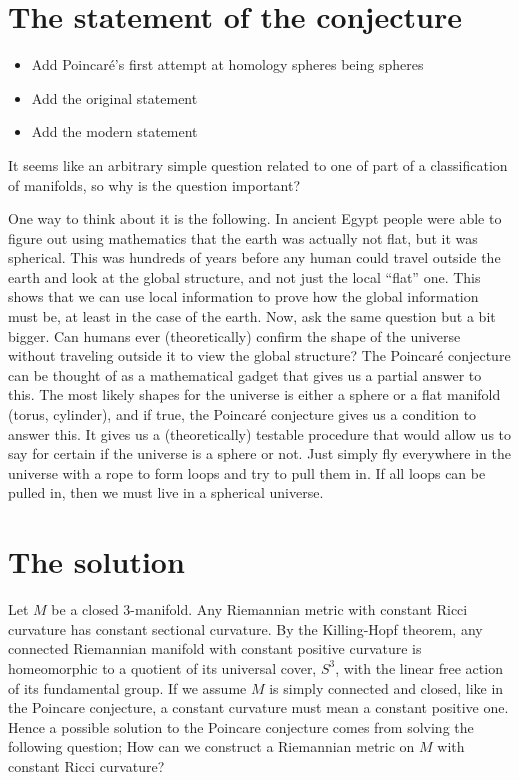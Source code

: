 

\section{The statement of the conjecture}

\begin{itemize}
    \item Add Poincaré's first attempt at homology spheres being spheres
    \item Add the original statement
    \item Add the modern statement
\end{itemize}

It seems like an arbitrary simple question related to one of part of a classification of manifolds, so why is the question important? 

One way to think about it is the following. 
In ancient Egypt people were able to figure out using mathematics that the earth was actually not flat, but it was spherical. 
This was hundreds of years before any human could travel outside the earth and look at the global structure, and not just the local ``flat'' one. 
This shows that we can use local information to prove how the global information must be, at least in the case of the earth. 
Now, ask the same question but a bit bigger. 
Can humans ever (theoretically) confirm the shape of the universe without traveling outside it to view the global structure? 
The Poincaré conjecture can be thought of as a mathematical gadget that gives us a partial answer to this. 
The most likely shapes for the universe is either a sphere or a flat manifold (torus, cylinder), and if true, the Poincaré conjecture gives us a condition to answer this. 
It gives us a (theoretically) testable procedure that would allow us to say for certain if the universe is a sphere or not. 
Just simply fly everywhere in the universe with a rope to form loops and try to pull them in. If all loops can be pulled in, then we must live in a spherical universe.   


\section{The solution}

Let $M$ be a closed 3-manifold. 
Any Riemannian metric with constant Ricci curvature has constant sectional curvature. 
By the Killing-Hopf theorem, any connected Riemannian manifold with constant positive curvature is homeomorphic to a quotient of its universal cover, $S^3$, with the linear free action of its fundamental group. 
If we assume $M$ is simply connected and closed, like in the Poincare conjecture, a constant curvature must mean a constant positive one. 
Hence a possible solution to the Poincare conjecture comes from solving the following question; 
How can we construct a Riemannian metric on $M$ with constant Ricci curvature?  


